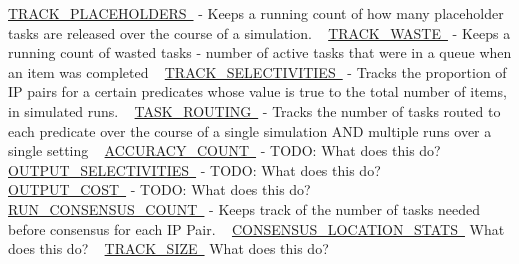  \mbox{\hyperlink{namespacedynamicfilterapp_1_1toggles_a2be074e9eca6d662578ca68c95050ad3}{T\+R\+A\+C\+K\+\_\+\+P\+L\+A\+C\+E\+H\+O\+L\+D\+E\+RS }} -\/ Keeps a running count of how many placeholder tasks are released over the course of a simulation. ~\newline
 \mbox{\hyperlink{namespacedynamicfilterapp_1_1toggles_ab80874aebf30b9d13f7928d5ecbd6ae2}{T\+R\+A\+C\+K\+\_\+\+W\+A\+S\+TE }} -\/ Keeps a running count of wasted tasks -\/ number of active tasks that were in a queue when an item was completed ~\newline
 \mbox{\hyperlink{namespacedynamicfilterapp_1_1toggles_acc098c8abb66db6192e90e5b54413c39}{T\+R\+A\+C\+K\+\_\+\+S\+E\+L\+E\+C\+T\+I\+V\+I\+T\+I\+ES }} -\/ Tracks the proportion of IP pairs for a certain predicates whose value is true to the total number of items, in simulated runs. ~\newline
 \mbox{\hyperlink{namespacedynamicfilterapp_1_1toggles_a267ac7f08878f62c6031a8fb38aa695b}{T\+A\+S\+K\+\_\+\+R\+O\+U\+T\+I\+NG }} -\/ Tracks the number of tasks routed to each predicate over the course of a single simulation A\+ND multiple runs over a single setting ~\newline
 \mbox{\hyperlink{namespacedynamicfilterapp_1_1toggles_ae898ca1b1c4681151406ecc2921a738b}{A\+C\+C\+U\+R\+A\+C\+Y\+\_\+\+C\+O\+U\+NT }} -\/ T\+O\+DO\+: What does this do? ~\newline
 \mbox{\hyperlink{namespacedynamicfilterapp_1_1toggles_ac8f124f313b63d29e1664ff5fc7a049f}{O\+U\+T\+P\+U\+T\+\_\+\+S\+E\+L\+E\+C\+T\+I\+V\+I\+T\+I\+ES }} -\/ T\+O\+DO\+: What does this do? ~\newline
 \mbox{\hyperlink{namespacedynamicfilterapp_1_1toggles_a2c3c37ecd0a669270751ba1fcdc0439f}{O\+U\+T\+P\+U\+T\+\_\+\+C\+O\+ST }} -\/ T\+O\+DO\+: What does this do? ~\newline
 \mbox{\hyperlink{namespacedynamicfilterapp_1_1toggles_ab852b5e6373777202ed3eabdf511f026}{R\+U\+N\+\_\+\+C\+O\+N\+S\+E\+N\+S\+U\+S\+\_\+\+C\+O\+U\+NT }} -\/ Keeps track of the number of tasks needed before consensus for each IP Pair. ~\newline
 \mbox{\hyperlink{namespacedynamicfilterapp_1_1toggles_ad7f3dbdec359eb538bf1890793d541ad}{C\+O\+N\+S\+E\+N\+S\+U\+S\+\_\+\+L\+O\+C\+A\+T\+I\+O\+N\+\_\+\+S\+T\+A\+TS }} What does this do? ~\newline
 \mbox{\hyperlink{namespacedynamicfilterapp_1_1toggles_a2051e4cd9bae895351ea7a73696fd815}{T\+R\+A\+C\+K\+\_\+\+S\+I\+ZE }} What does this do? ~\newline
